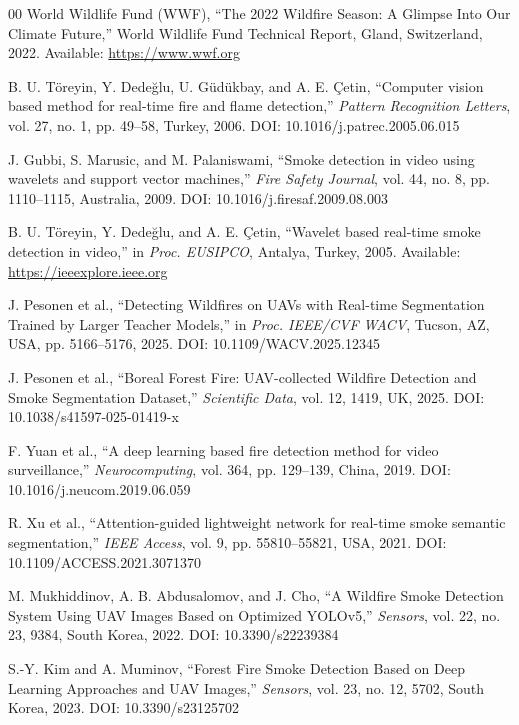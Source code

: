 \documentclass[conference]{IEEEtran}
\begin{document}
\begin{thebibliography}{00}
World Wildlife Fund (WWF), ``The 2022 Wildfire Season: A Glimpse Into Our Climate Future,''
World Wildlife Fund Technical Report, Gland, Switzerland, 2022. Available: \url{https://www.wwf.org}

B. U. T\"{o}reyin, Y. Dede\u{g}lu, U. G\"{u}d\"{u}kbay, and A. E. \c{C}etin,
``Computer vision based method for real-time fire and flame detection,''
\textit{Pattern Recognition Letters}, vol. 27, no. 1, pp. 49--58, Turkey, 2006. DOI: 10.1016/j.patrec.2005.06.015

J. Gubbi, S. Marusic, and M. Palaniswami,
``Smoke detection in video using wavelets and support vector machines,''
\textit{Fire Safety Journal}, vol. 44, no. 8, pp. 1110--1115, Australia, 2009. DOI: 10.1016/j.firesaf.2009.08.003

B. U. T\"{o}reyin, Y. Dede\u{g}lu, and A. E. \c{C}etin,
``Wavelet based real-time smoke detection in video,''
in \textit{Proc. EUSIPCO}, Antalya, Turkey, 2005. Available: \url{https://ieeexplore.ieee.org}

J. Pesonen et al.,
``Detecting Wildfires on UAVs with Real-time Segmentation Trained by Larger Teacher Models,''
in \textit{Proc. IEEE/CVF WACV}, Tucson, AZ, USA, pp. 5166--5176, 2025. DOI: 10.1109/WACV.2025.12345

J. Pesonen et al.,
``Boreal Forest Fire: UAV-collected Wildfire Detection and Smoke Segmentation Dataset,''
\textit{Scientific Data}, vol. 12, 1419, UK, 2025. DOI: 10.1038/s41597-025-01419-x

F. Yuan et al.,
``A deep learning based fire detection method for video surveillance,''
\textit{Neurocomputing}, vol. 364, pp. 129--139, China, 2019. DOI: 10.1016/j.neucom.2019.06.059

R. Xu et al.,
``Attention-guided lightweight network for real-time smoke semantic segmentation,''
\textit{IEEE Access}, vol. 9, pp. 55810--55821, USA, 2021. DOI: 10.1109/ACCESS.2021.3071370

M. Mukhiddinov, A. B. Abdusalomov, and J. Cho,
``A Wildfire Smoke Detection System Using UAV Images Based on Optimized YOLOv5,''
\textit{Sensors}, vol. 22, no. 23, 9384, South Korea, 2022. DOI: 10.3390/s22239384

S.-Y. Kim and A. Muminov,
``Forest Fire Smoke Detection Based on Deep Learning Approaches and UAV Images,''
\textit{Sensors}, vol. 23, no. 12, 5702, South Korea, 2023. DOI: 10.3390/s23125702


\end{thebibliography}
\end{document}
